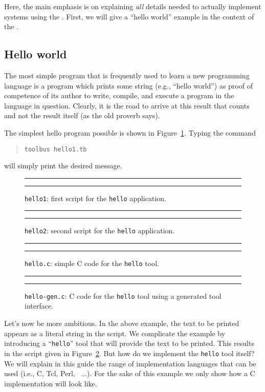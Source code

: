 Here, the main  emphasis is on explaining {\em all} details needed to actually
implement systems using the \TB. First, we will give a ``hello world'' example
in the context of the \TB.

\subsection{\label{Hello}Hello world}
The most simple program that is frequently used to learn a new
programming language is a program which prints some string (e.g.,
``hello world'') as proof of competence of its author to write,
compile, and execute a program in the language in question.  Clearly,
it is the road to arrive at this result that counts and not the result
itself (as the old proverb says).

The simplest hello program possible is shown in Figure~\ref{fig:hello1.tb}.
Typing the command
\begin{quote}
{\tt toolbus hello1.tb}
\end{quote}
will simply print the desired message.

\begin{figure}[tb]
\rule{\textwidth}{0.5mm}

  \caption{{\tt hello1}: first script for the {\tt hello} application.}
  \label{fig:hello1.tb}
\rule{\textwidth}{0.5mm}
\end{figure}

\begin{figure}[tb]
\rule{\textwidth}{0.5mm}

  \caption{{\tt hello2}: second script for the {\tt hello} application.}
  \label{fig:hello2.tb}
\rule{\textwidth}{0.5mm}
\end{figure}

\begin{figure}[tb]
\rule{\textwidth}{0.5mm}

  \caption{{\tt hello.c}: simple C code for the {\tt hello} tool.}
  \label{fig:hello.c}
\rule{\textwidth}{0.5mm}
\end{figure}

\begin{figure}[tb]
\rule{\textwidth}{0.5mm}

  \caption{{\tt hello-gen.c}: C code for the {\tt hello} tool using a generated tool interface.}
  \label{fig:hello-gen.c}
\rule{\textwidth}{0.5mm}
\end{figure}

Let's now be more ambitious. In the above example, the text to be printed
appears as a literal string in the script. We complicate the example
by introducing a ``{\tt hello}'' tool that will provide the text to be printed.
This results in the script given in Figure~\ref{fig:hello2.tb}.
But how do we implement the {\tt hello} tool itself?
We will explain in this guide the range of implementation languages that 
can be used (i.e., C, Tcl, Perl, \ASFSDF\ ...).
For the sake of this example we only show how a C implementation will look like.

